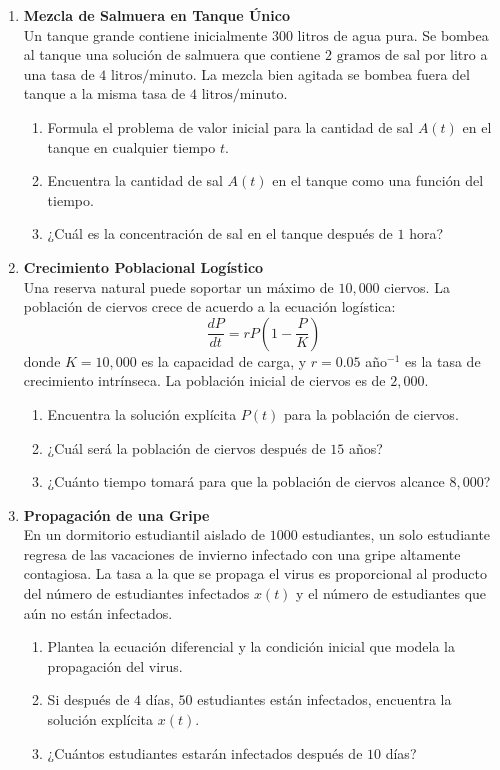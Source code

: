 \documentclass[a4paper,11pt]{article}
\begin{document}
\begin{enumerate}[itemsep=0.4cm, label=\textbf{\arabic*.}]
    \item \textbf{Mezcla de Salmuera en Tanque Único} \\
    Un tanque grande contiene inicialmente $300\text{ litros}$ de agua pura. Se bombea al tanque una solución de salmuera que contiene $2\text{ gramos}$ de sal por litro a una tasa de $4\text{ litros/minuto}$. La mezcla bien agitada se bombea fuera del tanque a la misma tasa de $4\text{ litros/minuto}$.
    \begin{enumerate}[label=(\alph*), itemsep=0.1cm]
        \item Formula el problema de valor inicial para la cantidad de sal $A(t)$ en el tanque en cualquier tiempo $t$.
        \item Encuentra la cantidad de sal $A(t)$ en el tanque como una función del tiempo.
        \item ¿Cuál es la concentración de sal en el tanque después de $1$ hora?
    \end{enumerate}

    \item \textbf{Crecimiento Poblacional Logístico} \\
    Una reserva natural puede soportar un máximo de $10,000$ ciervos. La población de ciervos crece de acuerdo a la ecuación logística:
    \[ \frac{dP}{dt} = r P \left(1 - \frac{P}{K}\right) \]
    donde $K = 10,000$ es la capacidad de carga, y $r = 0.05$ año$^{-1}$ es la tasa de crecimiento intrínseca. La población inicial de ciervos es de $2,000$.
    \begin{enumerate}[label=(\alph*), itemsep=0.1cm]
        \item Encuentra la solución explícita $P(t)$ para la población de ciervos.
        \item ¿Cuál será la población de ciervos después de $15$ años?
        \item ¿Cuánto tiempo tomará para que la población de ciervos alcance $8,000$?
    \end{enumerate}

    \item \textbf{Propagación de una Gripe} \\
    En un dormitorio estudiantil aislado de $1000$ estudiantes, un solo estudiante regresa de las vacaciones de invierno infectado con una gripe altamente contagiosa. La tasa a la que se propaga el virus es proporcional al producto del número de estudiantes infectados $x(t)$ y el número de estudiantes que aún no están infectados.
    \begin{enumerate}[label=(\alph*), itemsep=0.1cm]
        \item Plantea la ecuación diferencial y la condición inicial que modela la propagación del virus.
        \item Si después de $4$ días, $50$ estudiantes están infectados, encuentra la solución explícita $x(t)$.
        \item ¿Cuántos estudiantes estarán infectados después de $10$ días?
    \end{enumerate}


\end{enumerate}
\end{document}
